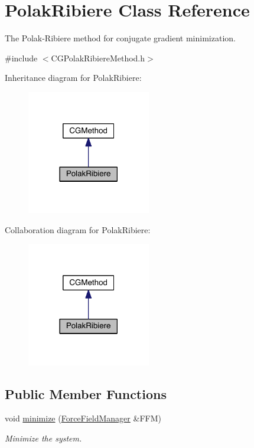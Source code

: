 \hypertarget{classPolakRibiere}{\section{Polak\+Ribiere Class Reference}
\label{classPolakRibiere}
}


The Polak-\/\+Ribiere method for conjugate gradient minimization.  




{\ttfamily \#include $<$C\+G\+Polak\+Ribiere\+Method.\+h$>$}



Inheritance diagram for Polak\+Ribiere\+:\nopagebreak
\begin{figure}[H]
\begin{center}
\leavevmode
\includegraphics[width=153pt]{classPolakRibiere__inherit__graph}
\end{center}
\end{figure}


Collaboration diagram for Polak\+Ribiere\+:\nopagebreak
\begin{figure}[H]
\begin{center}
\leavevmode
\includegraphics[width=153pt]{classPolakRibiere__coll__graph}
\end{center}
\end{figure}
\subsection*{Public Member Functions}
\begin{DoxyCompactItemize}
\item 
void \hyperlink{classPolakRibiere_af177d214c9d7b0f285ae93525be16329}{minimize} (\hyperlink{classForceFieldManager}{Force\+Field\+Manager} \&F\+F\+M)
\begin{DoxyCompactList}\small\item\em Minimize the system. \end{DoxyCompactList}\end{DoxyCompactItemize}
